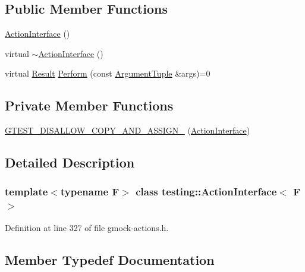 \subsection*{Public Member Functions}
\begin{DoxyCompactItemize}
\item 
\hyperlink{classtesting_1_1ActionInterface_a0f1d44e4c669a9cae5ee5b28419a6f52}{Action\+Interface} ()
\item 
virtual \hyperlink{classtesting_1_1ActionInterface_a7dd0a5fc93d86ae3c9d04963b9f3a93f}{$\sim$\+Action\+Interface} ()
\item 
virtual \hyperlink{classtesting_1_1ActionInterface_a7477de2fe3e4e01c59db698203acaee7}{Result} \hyperlink{classtesting_1_1ActionInterface_a20f8624fcea1786f2992b358760422a0}{Perform} (const \hyperlink{classtesting_1_1ActionInterface_af72720d864da4d606629e83edc003511}{Argument\+Tuple} \&args)=0
\end{DoxyCompactItemize}
\subsection*{Private Member Functions}
\begin{DoxyCompactItemize}
\item 
\hyperlink{classtesting_1_1ActionInterface_aea0e7557e7f56ee0f29bd7680846c6aa}{G\+T\+E\+S\+T\+\_\+\+D\+I\+S\+A\+L\+L\+O\+W\+\_\+\+C\+O\+P\+Y\+\_\+\+A\+N\+D\+\_\+\+A\+S\+S\+I\+G\+N\+\_\+} (\hyperlink{classtesting_1_1ActionInterface}{Action\+Interface})
\end{DoxyCompactItemize}


\subsection{Detailed Description}
\subsubsection*{template$<$typename F$>$\newline
class testing\+::\+Action\+Interface$<$ F $>$}



Definition at line 327 of file gmock-\/actions.\+h.



\subsection{Member Typedef Documentation}
\mbox{\label{classtesting_1_1ActionInterface_af72720d864da4d606629e83edc003511}} 
